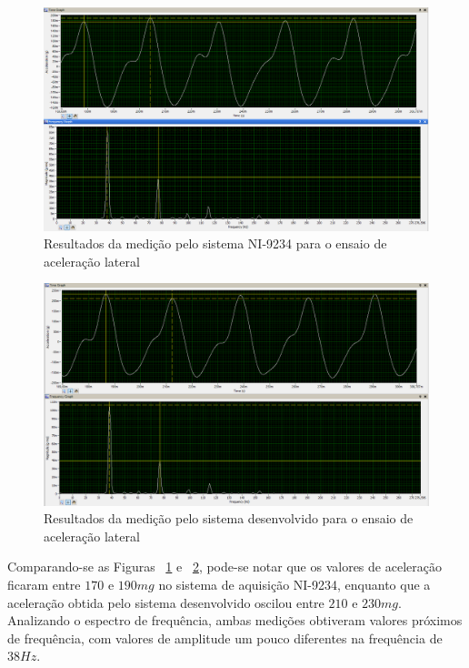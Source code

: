 \documentclass[
	12pt,				%
	openright,			%
	twoside,			%
	a4paper,			%
	english,			%
	french,				%
	spanish,			%
	brazil,				%
	]{abntex2}
\begin{document}
		\begin{figure}[!ht]
			\centering
			\includegraphics[width=\linewidth]{../Fotos/ni200mg.png}
			\caption{Resultados da medição pelo sistema NI-9234 para o ensaio de aceleração lateral}
			\label{fig:ni200mg}
		\end{figure}

		\begin{figure}[!ht]
			\centering
			\includegraphics[width=\linewidth]{../Fotos/kot200mg.png}
			\caption{Resultados da medição pelo sistema desenvolvido para o ensaio de aceleração lateral}
			\label{fig:kot200mg}
		\end{figure}

		Comparando-se as Figuras ~\ref{fig:ni200mg} e ~\ref{fig:kot200mg}, pode-se notar que os valores de aceleração ficaram entre $170$ e $190mg$ no sistema de aquisição NI-9234, enquanto que a aceleração obtida pelo sistema desenvolvido oscilou entre $210$ e $230mg$. Analizando o espectro de frequência, ambas medições obtiveram valores próximos de frequência, com valores de amplitude um pouco diferentes na frequência de $38Hz$.
\end{document}
